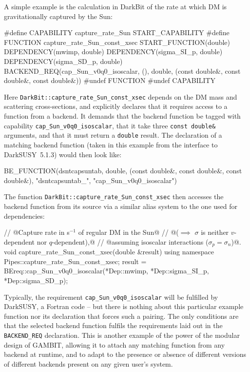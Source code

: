 \documentclass[pdftex,twocolumn,epjc3_preprint,runningheads]{svjour3}
\makeatletter
\renewcommand{\_}{\discretionary{\underscore}{}{\underscore}}
\newcommand\cpp[1]{{\lstinline!#1!}}  %
\newcommand\cpppragma[1]{{\CPPcommentstyle#1}}
\newcommand\CPPcommentstyle{\color{solarized@violet}\footnotesize\ttfamily}
\newcommand{\gambit}{\textsf{GAMBIT}\xspace}
\newcommand{\darkbit}{\textsf{DarkBit}\xspace}
\newcommand{\GB}{\gambit}
\newcommand{\ds}{\textsf{DarkSUSY}\xspace}
\newcommand{\darksusy}{\ds}
\newcommand\Fortran{\textsf{Fortran}\xspace}
\makeatother
\begin{document}
A simple example is the calculation in \darkbit of the rate at which DM is gravitationally captured by the Sun:
\begin{lstcpp}
#define CAPABILITY capture_rate_Sun
START_CAPABILITY
  #define FUNCTION capture_rate_Sun_const_xsec
  START_FUNCTION(double)
  DEPENDENCY(mwimp, double)
  DEPENDENCY(sigma_SI_p, double)
  DEPENDENCY(sigma_SD_p, double)
  BACKEND_REQ(cap_Sun_v0q0_isoscalar, (), double,
   (const double&, const double&, const double&))
  #undef FUNCTION
#undef CAPABILITY
\end{lstcpp}
Here \cpp{DarkBit::capture_rate_Sun_const_xsec} depends on the DM mass and scattering cross-sections, and explicitly declares that it requires access to a function from a backend.  It demands that the backend function be tagged with capability \cpp{cap_Sun_v0q0_isoscalar}, that it take three \cpp{const double&} arguments, and that it must return a \cpp{double} result.  The declaration of a matching backend function (taken in this example from the interface to \darksusy\ \textsf{5.1.3}) would then look like:
\begin{lstcpp}
BE_FUNCTION(dsntcapsuntab, double, (const double&,
 const double&, const double&), "dsntcapsuntab_",
 "cap_Sun_v0q0_isoscalar")
\end{lstcpp}
The function \cpp{DarkBit::capture_rate_Sun_const_xsec} then accesses the backend function from its source via a similar alias system to the one used for dependencies:
\begin{lstcpp}
// @\cpppragma{Capture rate in s$^{-1}$ of regular DM in the Sun}@
// @\cpppragma{($\implies$ $\sigma$ is neither $v$-dependent nor $q$-dependent),}@
// @\cpppragma{assuming isoscalar interactions ($\sigma_p = \sigma_n$)}@.
void capture_rate_Sun_const_xsec(double &result)
{
  using namespace
   Pipes::capture_rate_Sun_const_xsec;
  result =
   BEreq::cap_Sun_v0q0_isoscalar(*Dep::mwimp,
   *Dep::sigma_SI_p, *Dep::sigma_SD_p);
}
\end{lstcpp}
Typically, the requirement \cpp{cap_Sun_v0q0_isoscalar} will be fulfilled by \darksusy, a \Fortran code -- but there is nothing about this particular example function nor its declaration that forces such a pairing.  The only conditions are that the selected backend function fulfils the requirements laid out in the \cpp{BACKEND_REQ} declaration.  This is another example of the power of the modular design of \GB, allowing it to attach any matching function from any backend at runtime, and to adapt to the presence or absence of different versions of different backends present on any given user's system.
\end{document}

